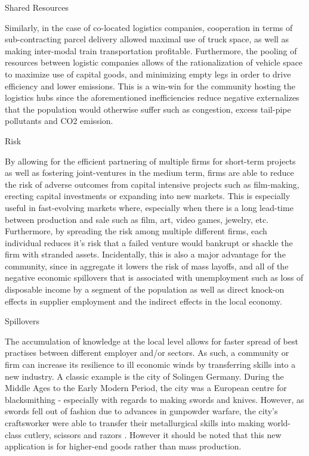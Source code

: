 \documentclass[12pt,letterpaper,notitlepage,onecolumn,final,openbib]{article}
\begin{document}
	
	Shared Resources
	
	
	Similarly, in the case of co-located logistics companies, cooperation in terms of sub-contracting parcel delivery allowed maximal use of truck space, as well as making inter-modal train transportation profitable.   Furthermore, the pooling of resources between logistic companies allows of the rationalization of vehicle space to maximize use of capital goods, and minimizing empty legs in order to drive efficiency and lower emissions. This is a win-win for the community hosting the logistics hubs since the aforementioned inefficiencies reduce negative externalizes that the population would otherwise suffer such as congestion, excess tail-pipe pollutants and CO2 emission.    \cite{HeuvelLangenDonselaarEtAl2014}     
	
	Risk 
	
	By allowing for the efficient partnering of multiple firms for short-term projects as well as fostering joint-ventures in the medium term, firms are able to reduce the risk of adverse outcomes from capital intensive projects such as film-making, erecting capital investments or expanding into new markets.  This is especially useful in fast-evolving markets where, especially when there is a long lead-time between production and sale such as film, art, video games, jewelry, etc.   Furthermore, by spreading the risk among multiple different firms, each individual reduces it's risk that a failed venture would bankrupt or shackle the firm with stranded assets.  Incidentally, this is also a major advantage for the community, since in aggregate it lowers the risk of mass layoffs, and all of the negative economic spillovers that is associated with unemployment such as loss of disposable income by a segment of the population as well as direct knock-on effects in supplier employment and the indirect effects in the local economy.  
	
	Spillovers
	
	The accumulation of knowledge at the local level allows for faster spread of best practises between different employer and/or sectors.  As such, a community or firm can increase its resilience to ill economic winds  by transferring skills into a new industry.  A classic example is the city of Solingen Germany.  During the Middle Ages to the Early Modern Period, the city was a European centre for blacksmithing - especially with regards to making swords and knives.  However, as swords fell out of fashion due to advances in gunpowder warfare, the city's craftsworker were able to transfer their metallurgical skills into making world-class cutlery, scissors and razors \cite{Solingen}.  However it should be noted that this new application is for higher-end goods rather than mass production.
	
\end{document}
